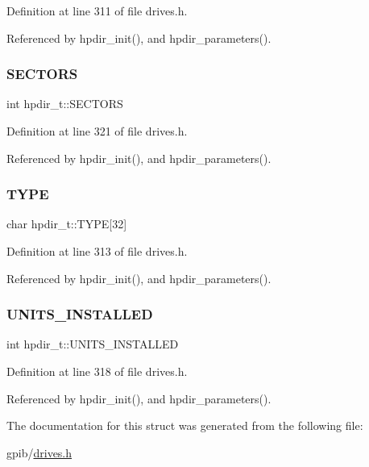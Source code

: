 Definition at line 311 of file drives.\+h.



Referenced by hpdir\+\_\+init(), and hpdir\+\_\+parameters().

\mbox{\label{structhpdir__t_ae666c8a13c52affb29d05690bcbcd714}} 
\subsubsection{\texorpdfstring{S\+E\+C\+T\+O\+RS}{SECTORS}}
{\footnotesize\ttfamily int hpdir\+\_\+t\+::\+S\+E\+C\+T\+O\+RS}



Definition at line 321 of file drives.\+h.



Referenced by hpdir\+\_\+init(), and hpdir\+\_\+parameters().

\mbox{\label{structhpdir__t_ad2f925b088d4fd746c9ea789f34f9507}} 
\subsubsection{\texorpdfstring{T\+Y\+PE}{TYPE}}
{\footnotesize\ttfamily char hpdir\+\_\+t\+::\+T\+Y\+PE\mbox{[}32\mbox{]}}



Definition at line 313 of file drives.\+h.



Referenced by hpdir\+\_\+init(), and hpdir\+\_\+parameters().

\mbox{\label{structhpdir__t_a4390cad586b742ba0cb4a479871c5a8c}} 
\subsubsection{\texorpdfstring{U\+N\+I\+T\+S\+\_\+\+I\+N\+S\+T\+A\+L\+L\+ED}{UNITS\_INSTALLED}}
{\footnotesize\ttfamily int hpdir\+\_\+t\+::\+U\+N\+I\+T\+S\+\_\+\+I\+N\+S\+T\+A\+L\+L\+ED}



Definition at line 318 of file drives.\+h.



Referenced by hpdir\+\_\+init(), and hpdir\+\_\+parameters().



The documentation for this struct was generated from the following file\+:\begin{DoxyCompactItemize}
\item 
gpib/\hyperlink{drives_8h}{drives.\+h}\end{DoxyCompactItemize}
